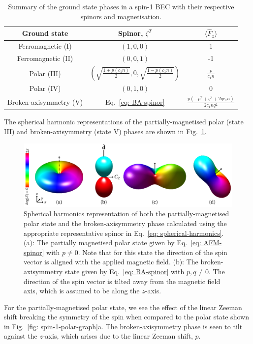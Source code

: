 \begin{table}
    \centering
    \begin{tabular}{ccc}
        \toprule
        Ground state & Spinor, \(\zeta^T\) & \(\langle\hat{F}_z\rangle\) \\
        \midrule
        Ferromagnetic (I) & \((1, 0, 0)\) & 1 \\
        Ferromagnetic (II) & \((0, 0, 1)\) & -1 \\
        Polar (III) & \(\left(\sqrt{\frac{1 + p(c_1n)}{2}}, 0,
        \sqrt{\frac{1 - p(c_1n)}{2}}\right)\) & \(\frac{p}{c_1n}\) \\
        Polar (IV) & \((0, 1, 0)\) & 0 \\
        Broken-axisymmetry (V) & Eq.~\eqref{eq: BA-spinor} &
        \(\frac{p(-p^2+q^2+2qc_1n)}{2c_1nq^2}\) \\
        \bottomrule
    \end{tabular}
    \caption[Ground states arising in spin-1 BECs in the presence of magnetic
    fields]
    {\label{tab: spin-1-ground-states}Summary of the ground state phases in a
    spin-1 BEC with their respective spinors and magnetisation.}
\end{table}

The spherical harmonic representations of the partially-magnetised polar
(state III) and broken-axisymmetry (state V) phases are shown in
Fig.~\ref{fig: spin-1-magnetised-graph}.
\begin{figure}
    \includegraphics[width=\textwidth]
    {gfx/ch-groundStateSymmetries/spin-1-ground-states.pdf}
    \caption[Spherical harmonic representation of spin-1 ground states]
    {\label{fig: spin-1-magnetised-graph}
    Spherical harmonics representation of both the partially-magnetised polar
    state and the broken-axisymmetry phase calculated using the appropriate
    representative spinor in Eq.~\eqref{eq: spherical-harmonics}.
    (a): The partially magnetised polar state given by
    Eq.~\eqref{eq: AFM-spinor} with \(p \neq 0\).
    Note that for this state the direction of the spin vector is aligned with
    the applied magnetic field.
    (b): The broken-axisymmetry state given by Eq.~\eqref{eq: BA-spinor} with
    \(p, q \neq 0\).
    The direction of the spin vector is tilted away from the magnetic field
    axis, which is assumed to be along the \(z\)-axis.}
\end{figure}
For the partially-magnetised polar state, we see the effect of the linear
Zeeman shift breaking the symmetry of the spin when compared to the polar state
shown in Fig.~\ref{fig: spin-1-polar-graph}a.
The broken-axisymmetry phase is seen to tilt against the \(z\)-axis, which
arises due to the linear Zeeman shift, \(p\).

